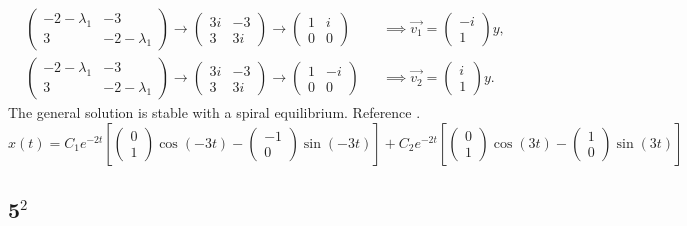 \documentclass[12pt]{article}
\begin{document}
\begin{equation*}
  \begin{aligned}
    &\begin{pmatrix}-2-\lambda_1&-3\\3&-2-\lambda_1\end{pmatrix}
    \rightarrow\begin{pmatrix}3i&-3\\3&3i\end{pmatrix}
    \rightarrow\begin{pmatrix}1&i\\0&0\end{pmatrix}
    &&\implies \vec{v_1} = \begin{pmatrix}-i\\1\end{pmatrix}y, \\
    &\begin{pmatrix}-2-\lambda_1&-3\\3&-2-\lambda_1\end{pmatrix}
    \rightarrow\begin{pmatrix}3i&-3\\3&3i\end{pmatrix}
    \rightarrow\begin{pmatrix}1&-i\\0&0\end{pmatrix}
    &&\implies \vec{v_2} = \begin{pmatrix}i\\1\end{pmatrix}y.
  \end{aligned}
\end{equation*}
The general solution is stable with a spiral equilibrium. Reference \todo[figure].
$$\boxed{x(t)=C_1e^{-2t}\left[\begin{pmatrix}0\\1\end{pmatrix}\cos(-3t)
  -\begin{pmatrix}-1\\0\end{pmatrix}\sin(-3t)\right]+
C_2e^{-2t}\left[\begin{pmatrix}0\\1\end{pmatrix}\cos(3t)
  -\begin{pmatrix}1\\0\end{pmatrix}\sin(3t)\right]}
$$
\newpage
\subsection{5$^2$}
\end{document}
